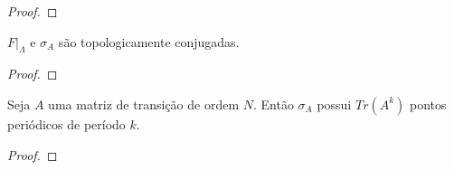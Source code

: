 \begin{proof}

\end{proof}


\begin{theorem}
$F|_\Lambda$ e $\sigma_A$ são topologicamente conjugadas.
\end{theorem}


\begin{proof}

\end{proof}


\begin{proposition}
Seja $A$ uma matriz de transição de ordem $N$. Então $\sigma_A$ possui $Tr(A^k)$ pontos periódicos de período $k$.
\end{proposition}


\begin{proof}

\end{proof}











